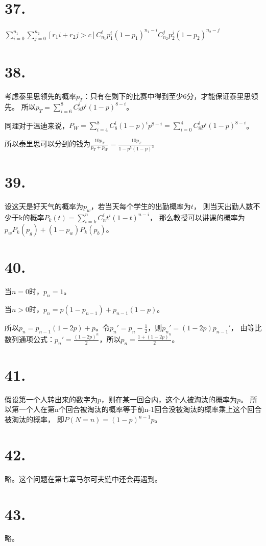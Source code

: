 \documentclass[UTF8]{report}
\begin{document}
    \section*{37.}
        $\sum_{i = 0}^{n_1}\sum_{j = 0}^{n_2}\left[r_1i + r_2j > c\right]C_{n_1}^ip_1^i(1 - p_1)^{n_1 - i}C_{n_2}^jp_2^j(1 - p_2)^{n_2 - j}$
    \section*{38.}
        考虑泰里思领先的概率$p_T$：只有在剩下的比赛中得到至少6分，才能保证泰里思领先。
        所以$p_T = \sum_{i = 6}^8C_8^ip^i(1 - p)^{8 - i}$。

        同理对于温迪来说，$P_W = \sum_{i = 4}^8C_8^i(1 - p)^ip^{8 - i} = \sum_{i = 0}^4C_8^ip^i(1 - p)^{8 - i}$。

        所以泰里思可以分到的钱为$\frac{10p_T}{p_T + p_W} = \frac{10p_T}{1 - p^5(1 - p)^3}$
    \section*{39.}
        设这天是好天气的概率为$p_w$，若当天每个学生的出勤概率为$t$，
        则当天出勤人数不少于k的概率$P_k(t) = \sum_{i = k}^nC_n^it^i(1 - t)^{n - i}$，
        那么教授可以讲课的概率为$p_wP_k(p_g) + (1 - p_w)P_k(p_b)$。
    \section*{40.}
        当$n = 0$时，$p_n = 1$。

        当$n > 0$时，$p_n = p(1 - p_{n - 1}) + p_{n - 1}(1 - p)$。

        所以$p_n = p_{n - 1}(1 - 2p) + p$。令$p_n' = p_n - \frac{1}{2}$，则$p_n' = (1 - 2p)p_{n - 1}'$，
        由等比数列通项公式：$p_n' = \frac{(1 - 2p)^n}{2}$，所以$p_n = \frac{1 + (1 - 2p)^n}{2}$。
    \section*{41.}
        假设第一个人转出来的数字为$p$，则在某一回合内，这个人被淘汰的概率为$p$。
        所以第一个人在第n个回合被淘汰的概率等于前n-1回合没被淘汰的概率乘上这个回合被淘汰的概率，
        即$P(N = n) = (1 - p)^{n - 1}p$。
    \section*{42.}
        略。这个问题在第七章马尔可夫链中还会再遇到。
    \section*{43.}
        略。
\end{document}
